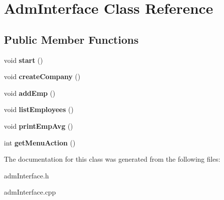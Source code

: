 \hypertarget{classAdmInterface}{}\section{Adm\+Interface Class Reference}
\label{classAdmInterface}
\subsection*{Public Member Functions}
\begin{DoxyCompactItemize}
\item 
void {\bfseries start} ()\hypertarget{classAdmInterface_ab28d4e7cf0a3ad9b277efbf6d3c52e8a}{}\label{classAdmInterface_ab28d4e7cf0a3ad9b277efbf6d3c52e8a}

\item 
void {\bfseries create\+Company} ()\hypertarget{classAdmInterface_af97123132594fb3cd0726cde7522eb9a}{}\label{classAdmInterface_af97123132594fb3cd0726cde7522eb9a}

\item 
void {\bfseries add\+Emp} ()\hypertarget{classAdmInterface_ae9c61b0679dee5b3b9e27b67e0f438cc}{}\label{classAdmInterface_ae9c61b0679dee5b3b9e27b67e0f438cc}

\item 
void {\bfseries list\+Employees} ()\hypertarget{classAdmInterface_a55897e2dd938d6dc2f3b04b841ddeb41}{}\label{classAdmInterface_a55897e2dd938d6dc2f3b04b841ddeb41}

\item 
void {\bfseries print\+Emp\+Avg} ()\hypertarget{classAdmInterface_ada0bc605c293328a8027027f7b3c5345}{}\label{classAdmInterface_ada0bc605c293328a8027027f7b3c5345}

\item 
int {\bfseries get\+Menu\+Action} ()\hypertarget{classAdmInterface_ad0303e181e2546eb0c9670265a4b8614}{}\label{classAdmInterface_ad0303e181e2546eb0c9670265a4b8614}

\end{DoxyCompactItemize}


The documentation for this class was generated from the following files\+:\begin{DoxyCompactItemize}
\item 
adm\+Interface.\+h\item 
adm\+Interface.\+cpp\end{DoxyCompactItemize}
